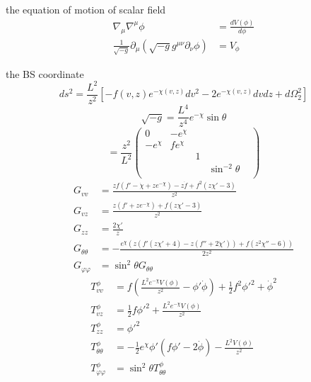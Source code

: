\documentclass[12pt,a4paper]{ctexart}
\numberwithin{equation}{section}
\begin{document}
the equation of motion of scalar field
\begin{equation}
    \begin{aligned}
        \nabla_\mu\nabla^\mu\phi&=\frac{dV(\phi)}{d\phi}\\
        \frac{1}{\sqrt{-g}}\partial_\mu(\sqrt{-g}g^{\mu\nu}\partial_\nu\phi)&=V_\phi
    \end{aligned}
\end{equation}

the BS coordinate
\begin{equation}
    ds^2=\frac{L^2}{z^2}[-f(v,z)e^{-\chi(v,z)}dv^2-2e^{-\chi(v,z)}dvdz+d\Omega_2^2]
\end{equation}
\begin{equation}
    \sqrt{-g}=\frac{L^4}{z^4}e^{-\chi}\sin\theta
\end{equation}
\begin{equation}
    [g^{\mu\nu}]=\frac{z^2}{L^2}
        \begin{pmatrix}
            0&-e^\chi&&\\
            -e^\chi&fe^\chi&&\\
            &&1&&\\
            &&&\sin^{-2}\theta&\\
        \end{pmatrix}
\end{equation}
\begin{align}
    G_{vv}&=\frac{z f \left(f'-\dot{\chi}+z e^{-\chi }\right)-z \dot{f}+f^2 \left(z \chi'-3\right)}{z^2} \\
    G_{vz}&=\frac{z \left(f'+z e^{-\chi }\right)+f \left(z \chi'-3\right)}{z^2} \\
    G_{zz}&=\frac{2 \chi'}{z} \\
    G_{\theta\theta}&=-\frac{e^{\chi } \left(z \left(f' \left(z \chi'+4\right)-z \left(f''+2 \dot{\chi}'\right)\right)+f \left(z^2 \chi''-6\right)\right)}{2 z^2} \\
    G_{\varphi\varphi}&=\sin^2\theta G_{\theta\theta}
\end{align}
\begin{align}
    T_{vv}^\phi&=f \left(\frac{L^2 e^{-\chi } V(\phi )}{z^2}-\phi' \dot{\phi}\right)+\frac{1}{2} f^2 \phi'^2+\dot{\phi}^2 \\
    T_{vz}^\phi&=\frac{1}{2} f \phi'^2+\frac{L^2 e^{-\chi } V(\phi )}{z^2} \\
    T_{zz}^\phi&=\phi'^2 \\
    T_{\theta\theta}^\phi&=-\frac{1}{2} e^{\chi } \phi' \left(f \phi'-2 \dot{\phi}\right)-\frac{L^2 V(\phi )}{z^2} \\
    T_{\varphi\varphi}^\phi&=\sin^2\theta T_{\theta\theta}^\phi
\end{align}
\end{document}
